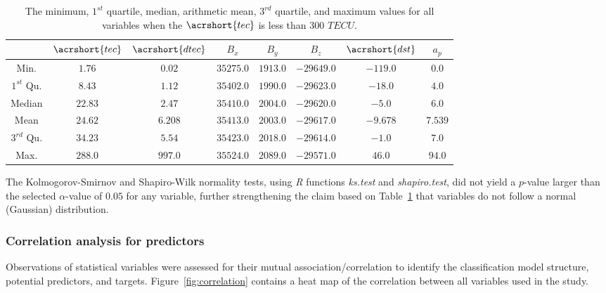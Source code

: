 \let\LaTeXcline\cline\documentclass[sn-mathphys-num]{sn-jnl}\let\cline\LaTeXcline
\begin{document}
\begin{table}[!ht]
    \centering
    \caption{The minimum, $1^{st}$ quartile, median, arithmetic mean, $3^{rd}$ quartile, and maximum values for all variables when the $\acrshort{tec}$ is less than $300$ $TECU$.}
    \label{tab:minmax}
        \begin{tabular}{|c|c|c|c|c|c|c|c|}
                \hline
                  & $\acrshort{tec}$ & $\acrshort{dtec}$ & $B_{x}$ & $B_{y}$ & $B_{z}$ & $\acrshort{dst}$ & $a_{p}$ \\ \hline
                Min. & $1.76$ & $0.02$ & $35275.0$ & $1913.0$ & $-29649.0$ & $-119.0$ & $0.0$ \\ \hline
                $1^{st}$ Qu. & $8.43$ & $1.12$ & $35402.0$ & $1990.0$ & $-29623.0$ & $-18.0$ & $4.0$ \\ \hline
                Median & $22.83$ & $2.47$ & $35410.0$ & $2004.0$ & $-29620.0$ & $-5.0$ & $6.0$ \\ \hline
                Mean & $24.62$ & $6.208$ & $35413.0$ & $2003.0$ & $-29617.0$ & $-9.678$ & $7.539$ \\ \hline
                $3^{rd}$ Qu. & $34.23$ & $5.54$ & $35423.0$ & $2018.0$ & $-29614.0$ & $-1.0$ & $7.0$ \\ \hline
                Max. & $288.0$ & $997.0$ & $35524.0$ & $2089.0$ & $-29571.0$ & $46.0$ & $94.0$ \\ \hline
        \end{tabular}
\end{table}

The Kolmogorov-Smirnov and Shapiro-Wilk normality tests, using \textit{R} functions \textit{ks.test} and \textit{shapiro.test}, did not yield a $p$-value larger than the selected $\alpha$-value of $0.05$ for any variable, further strengthening the claim based on Table~\ref{tab:minmax} that variables do not follow a normal (Gaussian) distribution.
  
\subsubsection{Correlation analysis for predictors}

Observations of statistical variables were assessed for their mutual association/correlation to identify the classification model structure, potential predictors, and targets. Figure~\ref{fig:correlation} contains a heat map of the correlation between all variables used in the study.
\end{document}
